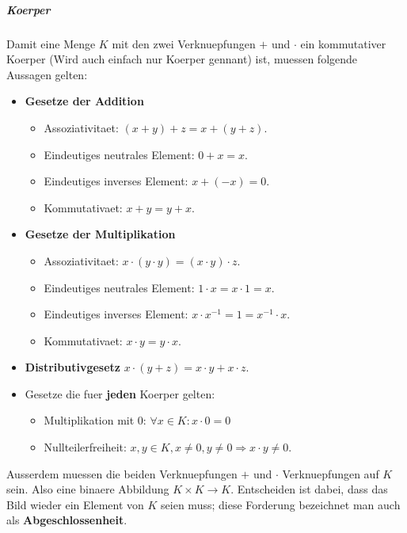 \documentclass[12pt]{article}
\begin{document}
\vspace{1cm}
\subparagraph{\large Koerper}
\normalsize
\begin{flushleft}
    Damit eine Menge $K$ mit den zwei Verknuepfungen $+$ und $\cdot$ ein kommutativer Koerper (Wird auch einfach nur Koerper gennant) ist, muessen folgende Aussagen gelten:
    \begin{itemize}
        \item \textbf{Gesetze der Addition}
        \begin{itemize}
            \item Assoziativitaet:
                $(x + y) + z = x + (y + z).$
            \item Eindeutiges neutrales Element:
                $0 + x = x.$
            \item Eindeutiges inverses Element: 
                $x + (-x) = 0.$
            \item Kommutativaet:
                $x + y = y + x.$
        \end{itemize}
        \item \textbf{Gesetze der Multiplikation}
        \begin{itemize}
            \item Assoziativitaet:
                $x \cdot (y \cdot y) = (x \cdot y) \cdot z.$
            \item Eindeutiges neutrales Element:
                $1 \cdot x = x \cdot 1 = x.$
            \item Eindeutiges inverses Element:
                $x \cdot x^{-1} = 1 = x^{-1} \cdot x.$
            \item Kommutativaet:
                $x \cdot y = y \cdot x.$
        \end{itemize}
        \item \textbf{Distributivgesetz}
            $x \cdot (y + z) = x \cdot y + x \cdot z.$
        \item Gesetze die fuer \textbf{jeden} Koerper gelten:
        \begin{itemize}
            \item Multiplikation mit 0:
                $\forall x \in K: x \cdot 0 = 0$
            \item Nullteilerfreiheit:
                $x,y \in K, x \not = 0, y \not = 0 \Rightarrow x \cdot y \not = 0.$
        \end{itemize}
    \end{itemize}
    Ausserdem muessen die beiden Verknuepfungen $+$ und $\cdot$ Verknuepfungen auf $K$ sein. Also eine binaere Abbildung $K \times K \rightarrow K$.
    Entscheiden ist dabei, dass das Bild wieder ein Element von $K$ seien muss; diese Forderung bezeichnet man auch als \textbf{Abgeschlossenheit}.
\end{flushleft}
\end{document}
